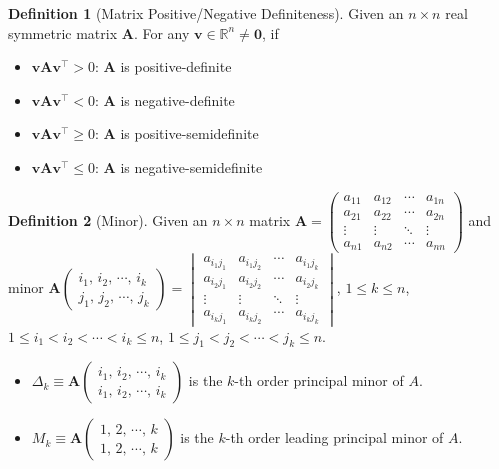 \documentclass[10pt]{extarticle}
\newcommand{\ds}{\displaystyle}
\theoremstyle{definition}
\newtheorem*{dfn}{Definition}
\newcommand{\vv}{\mathbf{v}}
\newcommand{\vA}{\mathbf{A}}
\newcommand{\vZero}{\mathbf{0}}
\begin{document}
\begin{dfn}[Matrix Positive/Negative Definiteness] 
  Given an $n\times n$ real symmetric matrix $\vA$. For any $\ds\vv\in\mathbb{R}^n\ne\vZero$, if 
  \begin{itemize}%
    \item $\ds\vv\vA\vv^\top > 0$: $\vA$ is positive-definite
    \item $\ds\vv\vA\vv^\top < 0$: $\vA$ is negative-definite
    \item $\ds\vv\vA\vv^\top \geqslant 0$: $\vA$ is positive-semidefinite
    \item $\ds\vv\vA\vv^\top \leqslant 0$: $\vA$ is negative-semidefinite
  \end{itemize}
\end{dfn}

\begin{dfn}[Minor] 
  Given an $n\times n$ matrix $\ds\vA = \begin{pmatrix}a_{11} & a_{12} & \cdots & a_{1n} \\ a_{21} & a_{22} & \cdots & a_{2n} \\ \vdots & \vdots & \ddots & \vdots \\ a_{n1} & a_{n2} & \cdots & a_{nn} \end{pmatrix}$ and minor $\ds\vA\begin{pmatrix}i_1,\,i_2,\,\cdots,\,i_k\\j_1,\,j_2,\,\cdots,\,j_k\end{pmatrix} = \begin{vmatrix}a_{i_1 j_1} & a_{i_1 j_2} & \cdots & a_{i_1 j_k} \\ a_{i_2 j_1} & a_{i_2 j_2} & \cdots & a_{i_2 j_k} \\ \vdots & \vdots & \ddots & \vdots \\ a_{i_k j_1} & a_{i_k j_2} & \cdots & a_{i_k j_k} \end{vmatrix}$, $1\leqslant k\leqslant n$, $1\leqslant i_1 < i_2 < \cdots < i_k \leqslant n$, $1\leqslant j_1 < j_2 < \cdots < j_k \leqslant n$. 
  \begin{itemize}%
    \item $\ds\Delta_k\equiv\vA\begin{pmatrix}i_1,\,i_2,\,\cdots,\,i_k\\i_1,\,i_2,\,\cdots,\,i_k\end{pmatrix}$ is the $k$-th order principal minor of $A$. 
    \item $\ds M_k\equiv\vA\begin{pmatrix}1,\,2,\,\cdots,\,k\\1,\,2,\,\cdots,\,k\end{pmatrix}$ is the $k$-th order leading principal minor of $A$. 
  \end{itemize}
\end{dfn}
\end{document}
